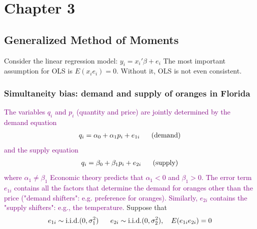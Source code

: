 \documentclass[a4paper,twoside,11pt]{article}
\begin{document}
\chapter{Chapter 3}
\section{Generalized Method of Moments}
Consider the linear regression model: $y_i = x_i' \beta + e_i$ 
\newline
\textcolor{NavyBlue}{The most important assumption for OLS is $E(x_i e_i)=0$. Without it, OLS is not even consistent.}
\subsection{Simultaneity bias: demand and supply of oranges in Florida}
\textcolor{Purple}{
The variables $q_i$ and $p_i$ (quantity and price) are jointly determined by the demand equation
\begin{equation*}
\begin{aligned}
q_i = \alpha_0 + \alpha_1 p_i + e_{1i} \ \ \ \ \ \textmd{(demand)} 
\end{aligned} 
\end{equation*}
and the supply equation
\begin{equation*}
\begin{aligned}
q_i = \beta_0 + \beta_1 p_i + e_{2i} \ \ \ \ \ \textmd{(supply)} 
\end{aligned} 
\end{equation*}
where $\alpha_1 \ne \beta_1$
\newline
\newline
Economic theory predicts that $\alpha_1< 0$ and $\beta_1 >0$.
\newline
The error term $e_{1i}$ contains all the factors that determine the demand
for oranges other than the price ("demand shifters": e.g. preference for oranges).
\newline
Similarly, $e_{2i}$ contains the "supply shifters": e.g., the temperature.}
\newline
\newline
Suppose that
\begin{equation*}
\begin{aligned}
e_{1i} \sim \textmd{i.i.d.} (0, \sigma_1^2) \ \ \ \ \ e_{2i} \sim \textmd{i.i.d.}(0, \sigma_2^2), \ \ \ E(e_{1i} e_{2i}) = 0
\end{aligned} 
\end{equation*}
\end{document}
